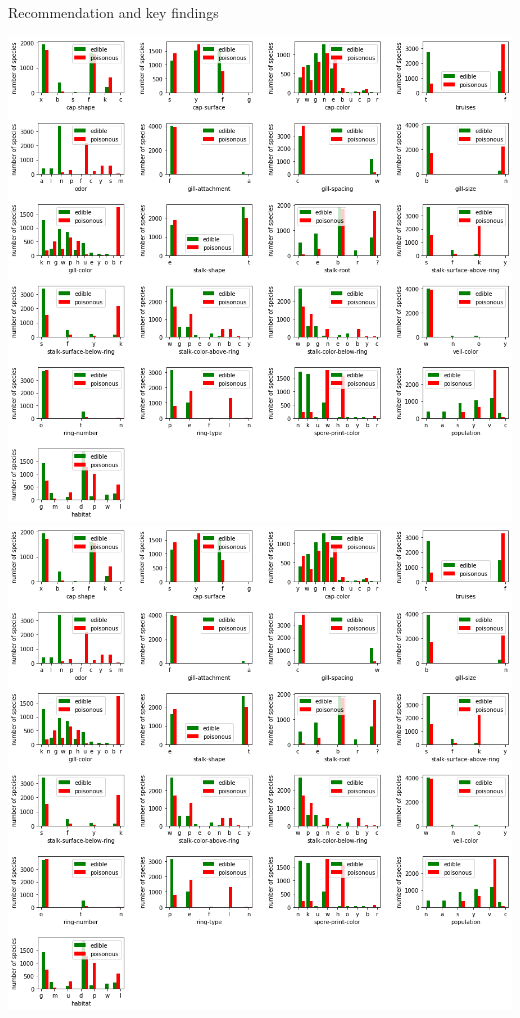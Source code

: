 \documentclass{beamer}
\begin{document}
\begin{frame}{Recommendation and key findings}
\begin{center}
\includegraphics[scale=0.4,trim=680 575 0 145,clip=true]{histograms.png}
\includegraphics[scale=0.4,trim=680 430 0 280,clip=true]{histograms.png}
\end{center}
\end{frame}
\end{document}
